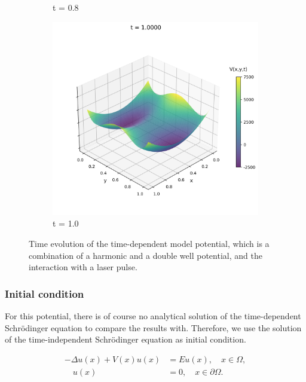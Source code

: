 \documentclass{article}
\theoremstyle{definition}
\theoremstyle{plain}
\theoremstyle{remark}
\begin{document}
\begin{figure}[h]
\begin{subfigure}[b]{0.3\textwidth}
    \caption{t = 0.8}
  \end{subfigure}
  \hfill
  \begin{subfigure}[b]{0.3\textwidth}
    \centering
    \includegraphics[width=\textwidth, trim=0cm 0cm 0cm 1cm, clip]{figures/potential_frame_0050.png}
    \caption{t = 1.0}
  \end{subfigure}
  \caption{Time evolution of the time-dependent model potential, which is a combination of a harmonic and a double well potential, and the interaction with a laser pulse.}
  \label{fig:potential_evolution}
\end{figure}

\subsubsection*{Initial condition}

For this potential, there is of course no analytical solution of the time-dependent Schrödinger equation to compare the results with. Therefore, we use the solution of the time-independent Schrödinger equation as initial condition.

  \begin{align*}
    - \Delta u(x) + V(x) u(x) &= E u(x), \quad x \in \Omega,\\
    \quad u(x) &= 0, \quad x \in \partial \Omega.
\end{align*}
\end{document}

